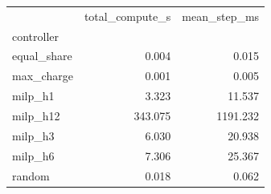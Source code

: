\begin{tabular}{lrr}
\toprule
 & total_compute_s & mean_step_ms \\
controller &  &  \\
\midrule
equal_share & 0.004 & 0.015 \\
max_charge & 0.001 & 0.005 \\
milp_h1 & 3.323 & 11.537 \\
milp_h12 & 343.075 & 1191.232 \\
milp_h3 & 6.030 & 20.938 \\
milp_h6 & 7.306 & 25.367 \\
random & 0.018 & 0.062 \\
\bottomrule
\end{tabular}
